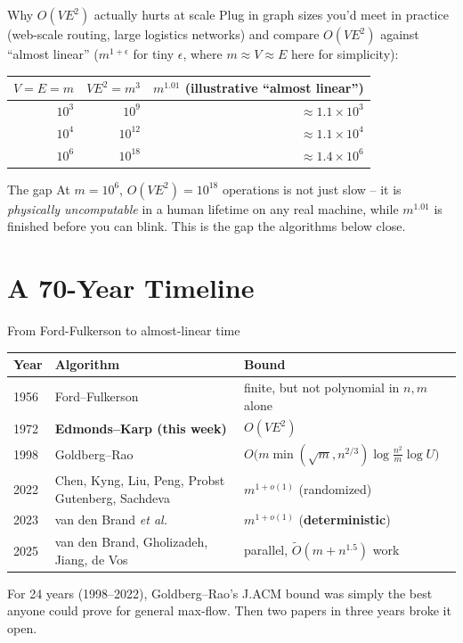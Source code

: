 \documentclass[11pt,aspectratio=169]{beamer}
\begin{document}
\begin{frame}{Why $O(VE^2)$ actually hurts at scale}
  \small
  Plug in graph sizes you'd meet in practice (web-scale routing, large logistics
  networks) and compare $O(VE^2)$ against ``almost linear'' ($m^{1+\epsilon}$ for tiny
  $\epsilon$, where $m \approx V \approx E$ here for simplicity):
  \begin{center}
  \begin{tabular}{@{}rrr@{}}
    \toprule
    $V = E = m$ & $VE^2 = m^3$ & $m^{1.01}$ (illustrative ``almost linear'') \\
    \midrule
    $10^3$ & $10^9$ & $\approx 1.1\times10^3$ \\
    $10^4$ & $10^{12}$ & $\approx 1.1\times10^4$ \\
    $10^6$ & $10^{18}$ & $\approx 1.4\times10^6$ \\
    \bottomrule
  \end{tabular}
  \end{center}
  \begin{exampleblock}{The gap}
    At $m=10^6$, $O(VE^2)=10^{18}$ operations is not just slow -- it is
    \emph{physically uncomputable} in a human lifetime on any real machine, while
    $m^{1.01}$ is finished before you can blink. This is the gap the algorithms below
    close.
  \end{exampleblock}
\end{frame}

\section{A 70-Year Timeline}

\begin{frame}{From Ford-Fulkerson to almost-linear time}
  \small
  \begin{center}
  \begin{tabular}{@{}lll@{}}
    \toprule
    Year & Algorithm & Bound \\
    \midrule
    1956 & Ford--Fulkerson & finite, but not polynomial in $n,m$ alone \\
    1972 & \textbf{Edmonds--Karp (this week)} & $O(VE^2)$ \\
    1998 & Goldberg--Rao & $O\big(m\min(\sqrt{m}, n^{2/3})\log\tfrac{n^2}{m}\log U\big)$ \\
    2022 & Chen, Kyng, Liu, Peng, Probst Gutenberg, Sachdeva & $m^{1+o(1)}$ (randomized) \\
    2023 & van den Brand \emph{et al.} & $m^{1+o(1)}$ (\textbf{deterministic}) \\
    2025 & van den Brand, Gholizadeh, Jiang, de Vos & parallel, $\tilde O(m{+}n^{1.5})$ work \\
    \bottomrule
  \end{tabular}
  \end{center}
  For 24 years (1998--2022), Goldberg--Rao's J.ACM bound was simply the best anyone
  could prove for general max-flow. Then two papers in three years broke it open.
\end{frame}
\end{document}
